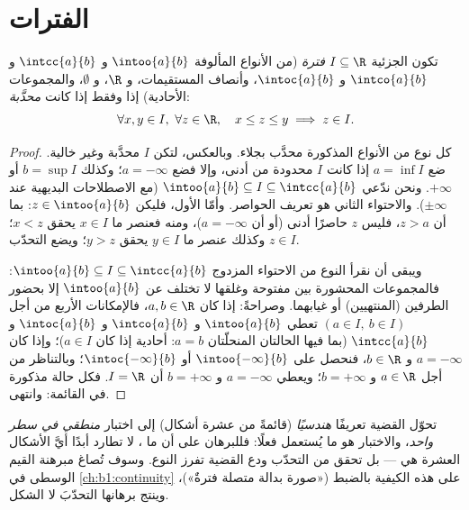 \section{الفترات}

\begin{proposition}\label{prop:b1:reals:intervals}
تكون  الجزئية $I \subseteq \R$ \emph{فترة} (من
الأنواع المألوفة $\intoo{a}{b}$ و $\intcc{a}{b}$ و $\intco{a}{b}$
و $\intoc{a}{b}$، وأنصاف المستقيمات، و $\R$، و $\emptyset$، والمجموعات الأحادية) إذا
وفقط إذا كانت \emph{محدَّبة}:
\[
\forall x, y \in I,\ \forall z \in \R, \quad
x \leq z \leq y \implies z \in I .
\]
\end{proposition}

\begin{proof}
كل نوع من الأنواع المذكورة محدَّب بجلاء. وبالعكس، لتكن $I$ محدَّبة
وغير خالية. ضع $a = \inf I$ إذا كانت $I$ محدودة من أدنى، وإلا فضع $a =
-\infty$؛ وكذلك $b = \sup I$ أو $+\infty$. ونحن ندّعي $\intoo{a}{b}
\subseteq I \subseteq \intcc{a}{b}$ (مع الاصطلاحات البديهية عند
$\pm\infty$). والاحتواء الثاني هو تعريف الحواصر. وأمّا
الأول، فليكن $z \in \intoo{a}{b}$: بما أن $z > a$، فليس $z$ حاصرًا
أدنى (أو أن $a = -\infty$)، ومنه فعنصر ما $x \in I$ يحقق $x < z$؛
وكذلك عنصر ما $y \in I$ يحقق $y > z$؛ ويضع التحدّب $z \in I$.

ويبقى أن نقرأ النوع من الاحتواء المزدوج
$\intoo{a}{b} \subseteq I \subseteq \intcc{a}{b}$: فالمجموعات
المحشورة بين  مفتوحة وغلقها لا تختلف عن
$\intoo{a}{b}$ إلا بحضور الطرفين (المنتهيين)
أو غيابهما. وصراحةً: إذا كان $a, b \in \R$، فالإمكانات الأربع
من أجل $(a \in I,\ b \in I)$ تعطي $\intoo{a}{b}$ و $\intco{a}{b}$
و $\intoc{a}{b}$ و $\intcc{a}{b}$ (بما فيها الحالتان المنحلّتان
$a = b$:  أحادية إذا كان $a \in I$)؛ وإذا كان $a = -\infty$ و $b \in
\R$، فنحصل على $\intoo{-\infty}{b}$ أو $\intoc{-\infty}{b}$؛
وبالتناظر من أجل $a \in \R$ و $b = +\infty$؛ ويعطي $a = -\infty$ و
$b = +\infty$ أن $I = \R$. فكل حالة مذكورة في القائمة: وانتهى.
\end{proof}

\begin{remark}
تحوّل القضية تعريفًا \emph{هندسيًا} (قائمةً من عشرة
أشكال) إلى اختبار \emph{منطقي في سطر واحد}، والاختبار
هو ما يُستعمل فعلًا: فللبرهان على أن  ما ،
لا تطارد أبدًا أيَّ الأشكال العشرة هي --- بل تحقق من التحدّب
ودع القضية تفرز النوع. وسوف تُصاغ مبرهنة القيم
الوسطى في \cref{ch:b1:continuity} على هذه الكيفية بالضبط
(«صورة  بدالة متصلة فترةٌ»)، وينتج برهانها
التحدّبَ لا الشكل.
\end{remark}

